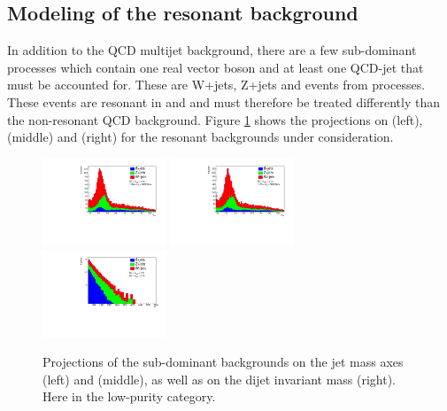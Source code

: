 \clearpage

\subsection{Modeling of the resonant background}
\label{sec:resbkgd}
In addition to the QCD multijet background, there are a few sub-dominant processes which contain one real vector boson and at least one QCD-jet that must be accounted for. These are W+jets, Z+jets and events from \ttbar processes. These events are resonant in \MJO and \MJT and must therefore be treated differently than the non-resonant QCD background. Figure \ref{fig:stack_res_bkg} shows the projections on \MJO (left), \MJT (middle) and \MVV (right) for the resonant backgrounds under consideration.
\begin{figure}[h!]
 \includegraphics[width=0.329\textwidth]{figures/analysis/search3/AN-17-303/resonantBkg/CP_background_px_xrange55-215_yrange55-215zrange1126-5000_HPLP.pdf}
 \includegraphics[width=0.329\textwidth]{figures/analysis/search3/AN-17-303/resonantBkg/CP_background_py_xrange55-215_yrange55-215zrange1126-5000_HPLP.pdf}
 \includegraphics[width=0.329\textwidth]{figures/analysis/search3/AN-17-303/resonantBkg/CP_background_pz_xrange55-215_yrange55-215zrange1126-5000_HPLP.pdf}
\caption{Projections of the sub-dominant backgrounds on the jet mass axes \MJO (left) and \MJT (middle), as well as on the dijet invariant mass \MVV (right). Here in the low-purity category.}
\label{fig:stack_res_bkg}
\end{figure}
